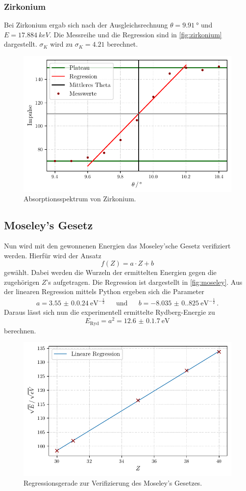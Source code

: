 \subsubsection{Zirkonium}
Bei Zirkonium ergab sich nach der Ausgleichsrechnung $\theta = \qty{9.91}{°}$ und $E = \qty{17.884}{keV}$.
Die Messreihe und die Regression sind in \autoref{fig:zirkonium} dargestellt.
$\sigma_K$ wird zu $\sigma_K = 4.21$ berechnet.
\begin{figure}[H]
  \centering
  \includegraphics[width=0.5 \linewidth]{build/zirkonium.pdf}
  \caption{Absorptionsspektrum von Zirkonium.}
  \label{fig:zirkonium}
\end{figure}

\subsection{Moseley's Gesetz}
Nun wird mit den gewonnenen Energien das Moseley'sche Gesetz verifiziert werden.
Hierfür wird der Ansatz
\begin{equation*}
  f(Z) = a \cdot Z + b
\end{equation*}
gewählt. Dabei werden die Wurzeln der ermittelten Energien gegen die zugehörigen $Z$'s aufgetragen.
Die Regression ist dargestellt in \autoref{fig:moseley}.
Aus der linearen Regression mittels Python ergeben sich die Parameter
\begin{align*}
  a = \qty{3.55(0.024)}{\eV}^{-\frac{1}{2}} && \text{und} && b  = \qty{-8.035(0.825)}{\eV}^{-\frac{1}{2}} \, .
\end{align*}
Daraus lässt sich nun die experimentell ermittelte Rydberg-Energie zu
\begin{equation*}
  E_\text{Ryd} = a^2 = \qty{12.6(0.17)}{\eV}
\end{equation*}
berechnen.

\begin{figure}
  \centering
  \includegraphics[width=0.5 \linewidth]{build/moseley.pdf}
  \caption{Regressionsgerade zur Verifizierung des Moseley's Gesetzes.}
  \label{fig:moseley}
\end{figure}